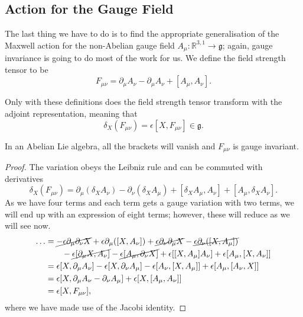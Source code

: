 \subsection{Action for the Gauge Field}%
\label{sub:action_for_the_gauge_field}

The last thing we have to do is to find the appropriate generalisation of the Maxwell action for the non-Abelian gauge field $A_{\mu} \colon \mathbb{R}^{3, 1} \to \mathfrak{g}$; again, gauge invariance is going to do most of the work for us.
We define the field strength tensor to be
\begin{equation}
  F_{\mu\nu} = \partial_{\mu} A_{\nu} - \partial_{\mu} A_{\nu} + [A_{\mu}, A_{\nu}].
\end{equation}
\begin{claim}
  \label{cl:24-1}
  Only with these definitions does the field strength tensor transform with the adjoint representation, meaning that
  \begin{equation}
    \delta_X(F_{\mu\nu}) = \epsilon [X, F_{\mu\nu}] \in \mathfrak{g}.
  \end{equation}
\end{claim}
\begin{remark}
  In an Abelian Lie algebra, all the brackets will vanish and $F_{\mu\nu}$ is gauge invariant.
\end{remark}
\begin{proof}
  The variation obeys the Leibniz rule and can be commuted with derivatives
  \begin{equation}
    \delta_X(F_{\mu\nu}) = \partial_{\mu} (\delta_X A_{\nu}) - \partial_{\nu} ( \delta_X A_{\mu}) + [\delta_X A_{\mu}, A_{\nu}] + [A_{\mu}, \delta_X A_{\nu}].
  \end{equation}
  As we have four terms and each term gets a gauge variation with two terms, we will end up with an expression of eight terms; however, these will reduce as we will see now.
  \begin{align}
    \dots &= \cancel{-\epsilon \partial_{\mu} \partial_{\nu} X} + \epsilon \partial_{\mu} ([X, A_{\nu}]) + \cancel{\epsilon \partial_{\nu} \partial_{\mu} X} - \cancel{\epsilon \partial_{\nu} ([X, A_{\mu}])} \nonumber \\ 
	  & \qquad - \cancel{\epsilon [\partial_{\mu} X, A_{\nu}]} - \cancel{\epsilon [A_{\mu}, \partial_{\nu}X]} + \epsilon [[X, A_{\mu}] A_{\nu}] + \epsilon[A_{\mu}, [X, A_{\nu}]] \\
	  &= \epsilon [X, \partial_{\mu} A_{\nu}] - \epsilon[X, \partial_{\nu} A_{\mu}] - \epsilon [A_{\nu}, [X, A_{\mu}]] + \epsilon [A_{\mu}, [A_{\nu}, X]] \\
	  &= \epsilon [X, \partial_{\mu} A_{\nu} - \partial_{\nu} A_{\mu}] + \epsilon [X, [A_{\mu}, A_{\nu}]] \\
	  &= \epsilon [X, F_{\mu\nu}],
  \end{align}
  where we have made use of the Jacobi identity.
\end{proof}

